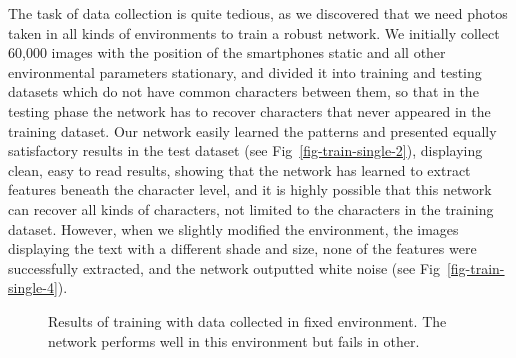 The task of data collection is quite tedious, as we discovered that we need photos taken in all kinds of environments to train a robust network. We initially collect 60,000 images with the position of the smartphones static and all other environmental parameters stationary, and divided it into training and testing datasets which do not have common characters between them, so that in the testing phase the network has to recover characters that never appeared in the training dataset. Our network easily learned the patterns and presented equally satisfactory results in the test dataset (see Fig~\ref{fig-train-single-2}), displaying clean, easy to read results, showing that the network has learned to extract features beneath the character level, and it is highly possible that this network can recover all kinds of characters, not limited to the characters in the training dataset. However, when we slightly modified the environment, the images displaying the text with a different shade and size, none of the features were successfully extracted, and the network outputted white noise (see Fig~\ref{fig-train-single-4}).
 \begin{figure}
     \centering
        \caption{Results of training with data collected in fixed environment. The network performs well in this environment but fails in other.}
        \label{fig-train-single}
\end{figure}

